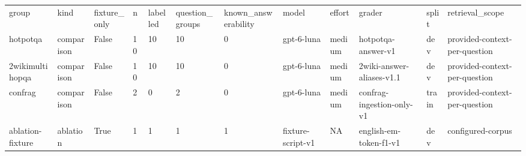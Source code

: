 \begin{tabular}{llllllllllll}
\hline
group & kind & fixture\_only & n & labelled & question\_groups & known\_answerability & model & effort & grader & split & retrieval\_scope \\
hotpotqa & comparison & False & 10 & 10 & 10 & 0 & gpt-6-luna & medium & hotpotqa-answer-v1 & dev & provided-context-per-question \\
2wikimultihopqa & comparison & False & 10 & 10 & 10 & 0 & gpt-6-luna & medium & 2wiki-answer-aliases-v1.1 & dev & provided-context-per-question \\
confrag & comparison & False & 2 & 0 & 2 & 0 & gpt-6-luna & medium & confrag-ingestion-only-v1 & train & provided-context-per-question \\
ablation-fixture & ablation & True & 1 & 1 & 1 & 1 & fixture-script-v1 & NA & english-em-token-f1-v1 & dev & configured-corpus \\
\hline
\end{tabular}

